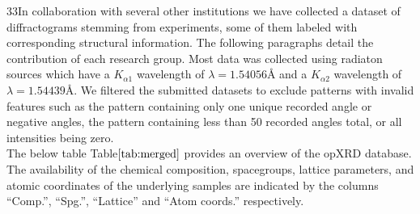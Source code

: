 33In collaboration with several other institutions we have collected a dataset of diffractograms stemming from experiments, some of them labeled with corresponding structural information. The following paragraphs detail the contribution of each research group. Most data was collected using  radiaton sources which have a  $K_{\alpha1}$ wavelength of $\lambda=1.54056\text{\AA}$ and a $K_{\alpha2}$ wavelength of $\lambda=1.54439\text{\AA}$. We filtered the submitted datasets to exclude patterns with invalid features such as the pattern containing only one unique recorded angle or negative angles, the pattern containing less than 50 recorded angles total, or all intensities being zero. \\

The below table Table$\eqref{tab:merged}$ provides an overview of the opXRD database. The availability of the chemical composition, spacegroups, lattice parameters, and atomic coordinates of the underlying samples are indicated by the columns ``Comp.'', ``Spg.'', ``Lattice'' and ``Atom coords.'' respectively.

\begin{table}[!htb]
\centering
\caption{The opXRD database}
\label{tab:merged}
\end{table}

